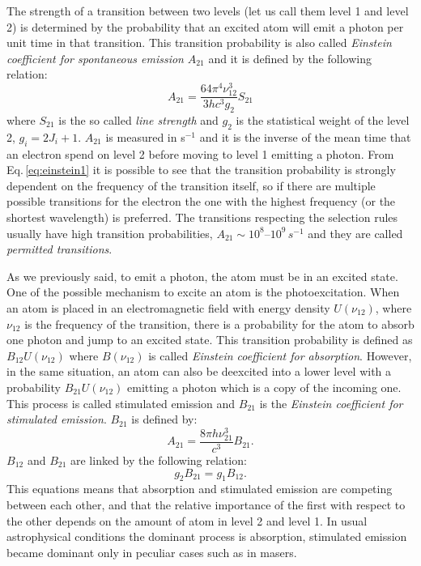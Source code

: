 \documentclass[../thesis.tex]{subfiles}
\begin{document}
The strength of a transition between two levels (let us call them level 1 and level 2) is determined by the probability that an excited atom will emit a photon per unit time in that transition.
This transition probability is also called \emph{Einstein coefficient for spontaneous emission} $A_{21}$ and it is defined by the following relation:
\begin{equation}
    \label{eq:einstein1}
    A_{21} = \frac{64\pi^{4}\nu_{12}^3}{3hc^3g_2}S_{21}
\end{equation}
where $S_{21}$ is the so called \emph{line strength} and $g_2$ is the statistical weight of the level 2, $g_i = 2J_i+1$.
$A_{21}$ is measured in s$^{-1}$ and it is the inverse of the mean time that an electron spend on level 2 before moving to level 1 emitting a photon.
From Eq.\,\ref{eq:einstein1} it is possible to see that the transition probability is strongly dependent on the frequency of the transition itself, so if there are multiple possible transitions for the electron the one with the highest frequency (or the shortest wavelength) is preferred.
The transitions respecting the selection rules usually have high transition probabilities, $A_{21}\sim 10^8$--$10^9\,\si{s^{-1}}$ and they are called \emph{permitted transitions}.

As we previously said, to emit a photon, the atom must be in an excited state.
One of the possible mechanism to excite an atom is the photoexcitation.
When an atom is placed in an electromagnetic field with energy density $U(\nu_{12})$, where $\nu_{12}$ is the frequency of the transition, there is a probability for the atom to absorb one photon and jump to an excited state.
This transition probability is defined as $B_{12}U(\nu_{12})$ where $B(\nu_{12})$ is called \emph{Einstein coefficient for absorption}.
However, in the same situation, an atom can also be deexcited into a lower level with a probability $B_{21}U(\nu_{12})$ emitting a photon which is a copy of the incoming one.
This process is called stimulated emission and $B_{21}$ is the \emph{Einstein coefficient for stimulated emission}.
$B_{21}$ is defined by:
\begin{equation}
    \label{eq:einstein2}
    A_{21} = \frac{8\pi h\nu_{21}^3}{c^3} B_{21}.
\end{equation}
$B_{12}$ and $B_{21}$ are linked by the following relation:
\begin{equation}
    \label{eq:einstein3}
    g_2B_{21} = g_1B_{12}.
\end{equation}
This equations means that absorption and stimulated emission are competing between each other, and that the relative importance of the first with respect to the other depends on the amount of atom in level 2 and level 1.
In usual astrophysical conditions the dominant process is absorption, stimulated emission became dominant only in peculiar cases such as in masers. 
\end{document}
